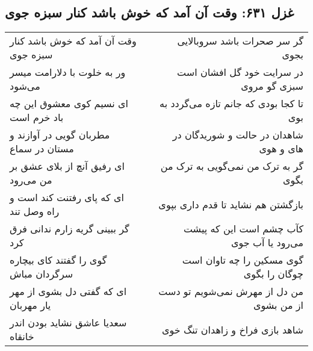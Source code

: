 \begin{center}
\section*{غزل ۶۳۱: وقت آن آمد که خوش باشد کنار سبزه جوی}
\label{sec:631}
\begin{longtable}{l p{0.5cm} r}
وقت آن آمد که خوش باشد کنار سبزه جوی
&&
گر سر صحرات باشد سروبالایی بجوی
\\
ور به خلوت با دلارامت میسر می‌شود
&&
در سرایت خود گل افشان است سبزی گو مروی
\\
ای نسیم کوی معشوق این چه باد خرم است
&&
تا کجا بودی که جانم تازه می‌گردد به بوی
\\
مطربان گویی در آوازند و مستان در سماع
&&
شاهدان در حالت و شوریدگان در های و هوی
\\
ای رفیق آنچ از بلای عشق بر من می‌رود
&&
گر به ترک من نمی‌گویی به ترک من بگوی
\\
ای که پای رفتنت کند است و راه وصل تند
&&
بازگشتن هم نشاید تا قدم داری بپوی
\\
گر ببینی گریه زارم ندانی فرق کرد
&&
کآب چشم است این که پیشت می‌رود یا آب جوی
\\
گوی را گفتند کای بیچاره سرگردان مباش
&&
گوی مسکین را چه تاوان است چوگان را بگوی
\\
ای که گفتی دل بشوی از مهر یار مهربان
&&
من دل از مهرش نمی‌شویم تو دست از من بشوی
\\
سعدیا عاشق نشاید بودن اندر خانقاه
&&
شاهد بازی فراخ و زاهدان تنگ خوی
\\
\end{longtable}
\end{center}

